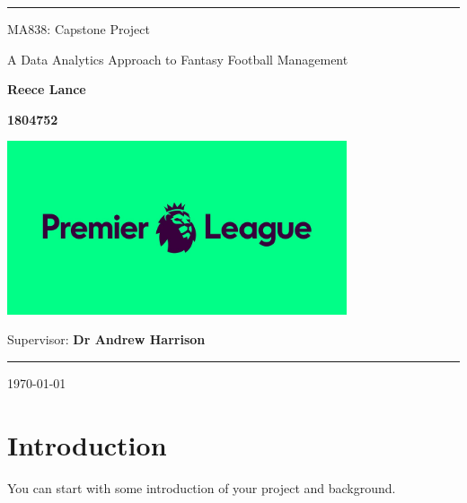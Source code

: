 \documentclass[12pt, a4paper,oneside]{book}
\numberwithin{equation}{section}
\begin{document}
\begin{center}

\noindent\textcolor{prempurple}{\rule{\linewidth}{4.8pt}}

\vspace{1cm}

{\LARGE \sc  MA838: Capstone Project}

\vspace{1.5cm}

{\Huge{A Data Analytics Approach to Fantasy Football Management}}

\vspace{1.5cm}

{\Large \bf Reece Lance}

\vspace{0.5cm}

{\Large \bf 1804752}

\vspace{1.5cm}

\centerline{\includegraphics[width=0.75\textwidth]{prem_logo.jpeg}}

\vspace{1.5cm}

{\Large {Supervisor:} {\bf Dr Andrew Harrison}}

\vspace{.25cm}

\noindent\textcolor{prempurple}{\rule{\linewidth}{4.8pt}}

\vspace{1cm}
{\Large \today }\\[4pt]
\end{center}
\newpage
\tableofcontents

\listoffigures
\listoftables


\chapter{Introduction}\label{ch:1}

You can start with some introduction of your project and background. 
\end{document}
